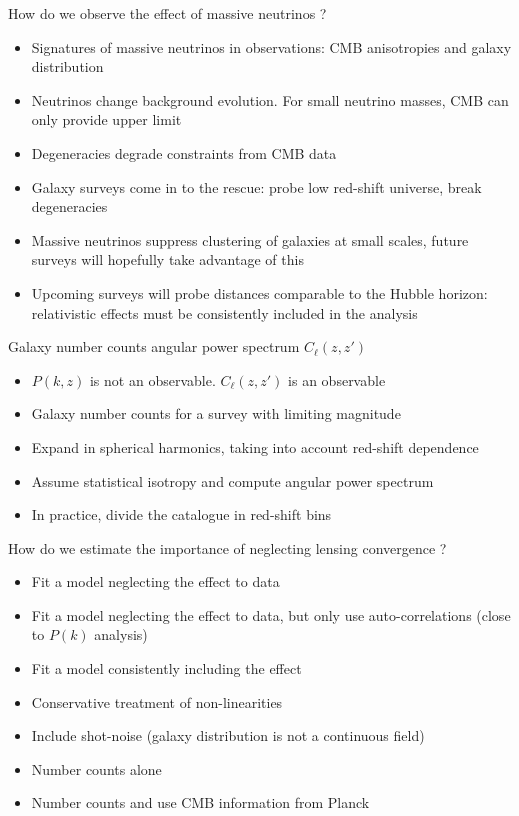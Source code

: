 \documentclass{beamer}
\begin{document}
\begin{frame}{How do we observe the effect of massive neutrinos ?}
\begin{itemize}
\item Signatures of massive neutrinos in observations: CMB anisotropies and galaxy distribution
\item Neutrinos change background evolution. For small neutrino masses, CMB can only provide upper limit 
\item Degeneracies degrade constraints from CMB data
\item Galaxy surveys come in to the rescue: probe low red-shift universe, break degeneracies
\item Massive neutrinos suppress clustering of galaxies at small scales, future surveys will hopefully take advantage of this
\item Upcoming surveys will probe distances comparable to the Hubble horizon: relativistic effects must be consistently included in the analysis
\end{itemize}

\end{frame}

\begin{frame}{Galaxy number counts angular power spectrum $C_\ell(z,z')$}
\begin{itemize}
\item $P(k,z)$ is not an observable. $C_\ell(z,z')$ is an observable
\item Galaxy number counts for a survey with limiting magnitude
\item Expand in spherical harmonics, taking into account red-shift dependence
\item Assume statistical isotropy and compute angular power spectrum 
\item In practice, divide the catalogue in red-shift bins 
\end{itemize}
\end{frame}

\begin{frame}{How do we estimate the importance of neglecting lensing convergence ?}
\begin{itemize}
\item Fit a model neglecting the effect to data 
\item Fit a model neglecting the effect to data, but only use auto-correlations (close to $P(k)$ analysis)
\item Fit a model consistently including the effect 
\item Conservative treatment of non-linearities
\item Include shot-noise (galaxy distribution is not a continuous field)
\item Number counts alone 
\item Number counts and use CMB information from Planck
\end{itemize}
\end{frame}
\end{document}
